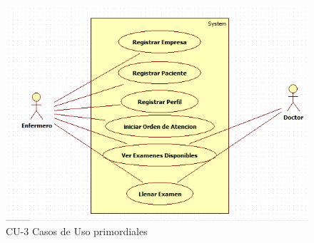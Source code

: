 	\begin{figure}[ht!]
	    \centering
		\includegraphics{../imgs/casos-uso/3.png}
		\caption{CU-3 Casos de Uso primordiales}
	\end{figure}